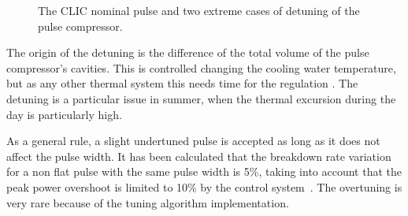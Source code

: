  
\begin{figure}[h]
\centering
{}
\hspace{2mm}
\caption{The CLIC nominal pulse and two extreme cases of detuning of the pulse compressor.}
\label{spikesAndDetuning}
\end{figure}
 



The origin of the detuning is the difference of the total volume of the pulse compressor's cavities. This is controlled changing the cooling water temperature, but as any other thermal system this needs time for the regulation \cite{Woolley:CWS2016}. The detuning is a particular issue in summer, when the thermal excursion during the day is particularly high.

As a general rule, a slight undertuned pulse is accepted as long as it does not affect the pulse width. It has been calculated that the breakdown rate variation for a non flat pulse with the same pulse width is 5\%, taking into account that the peak power overshoot is limited to 10\% by the control system~\cite{Frank:PC}.  The overtuning is very rare because of the tuning algorithm implementation.

